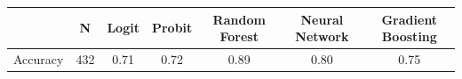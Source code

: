 \begin{tabular}{lcccccc}
\toprule
                     & N    & Logit & Probit & Random Forest & Neural Network & Gradient Boosting \\
\midrule
\midrule
Accuracy           & 432 &  0.71  & 0.72   & \cellcolor[rgb]{ .929,  .929,  .929} 0.89  & 0.80   & 0.75 \\
\bottomrule
\end{tabular}